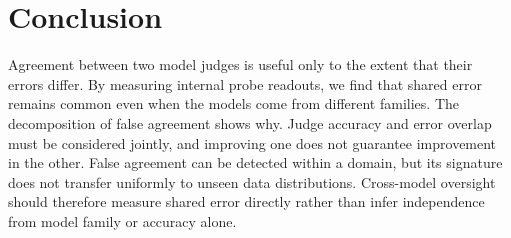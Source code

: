 \section{Conclusion}
\label{sec:conclusion}

Agreement between two model judges is useful only to the extent that their
errors differ. By measuring internal probe readouts, we find that shared error
remains common even when the models come from different families. The
decomposition of false agreement shows why. Judge accuracy and error overlap
must be considered jointly, and improving one does not guarantee improvement in
the other. False agreement can be detected within a domain, but its signature
does not transfer uniformly to unseen data distributions. Cross-model oversight
should therefore measure shared error directly rather than infer independence
from model family or accuracy alone.
